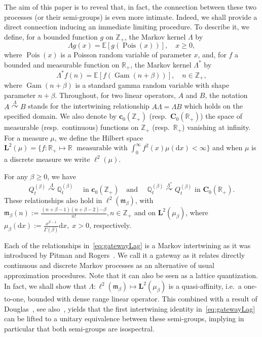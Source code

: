 \documentclass[AHL,Unicode,longabstracts]{cedram}
\DeclareMathOperator{\Pois}{Pois}
\DeclareMathOperator{\Gam}{Gam}
\newcommand{\df}{\mathrel{:=}}
\newcommand{\EE}{\mathbb{E}}
\newcommand{\RR}{\mathbb{R}}
\newcommand{\ZZ}{\mathbb{Z}}
\newcommand{\fm}{\mathfrak{m}}
\newcommand{\esL}{\mathbf{L}}
\newcommand{\esC}{\mathbf{C}}
\newcommand{\esc}{\mathbf{c}}
\newcommand*\E{{\mathbb E}}
\newcommand*\R{{\mathbb R}}
\newcommand{\discret}[1]{\mathds{#1}}
\newcommand{\cont}[1]{{#1}}
\newcommand{\adjL}{\Lambda^*}
\newcommand{\Gate}[3]{#1\stackrel{#2}{\curvearrowright}#3}
\newcommand*{\dd}{\mathrm{d}}
\newcommand*{\dx}{\dd x}
\begin{document}
The aim of this paper is to reveal that, in fact, the connection between these two processes (or their semi-groups) is even more intimate. Indeed, we shall provide a direct connection inducing an immediate limiting procedure. To describe it, we define, for a bounded function $g$ on $\ZZ_+$, the Markov kernel $\Lambda$ by
\begin{equation}\label{eq:Lambda-def}
\Lambda g (x) = \E\left[g(\Pois(x))\right], \quad x\geq 0,
\end{equation}
where $\Pois(x)$ is a Poisson random variable of parameter $x$, and, for $f$ a bounded and measurable function on $\RR_+$, the Markov kernel $\adjL$ by
\begin{equation}\label{eq:tild-Lambda-def}
\adjL f(n)=\EE[f(\Gam(n+\beta))],\quad n\in \ZZ_+,
\end{equation}
where $\Gam(n+\beta)$ is a standard gamma random variable with shape parameter $n+\beta$. Throughout, for two linear operators, $A$ and $B$, the notation $\Gate{A}{\Lambda}{B}$ stands for the intertwining relationship $A\Lambda=\Lambda B$ which holds on the specified domain. We also denote by $\esc_0(\ZZ_+)$ (resp.~$\esC_0(\RR_+)$) the space of measurable (resp.~continuous) functions on $\ZZ_+$ (resp.~$\RR_+$) vanishing at infinity. For a measure $\mu$, we define the Hilbert space $\esL^2(\mu)=\{f :\RR_+\mapsto \R \; \text{ measurable with } \int_{0}^{\infty}f^2(x) \mu(\dx)<\infty\}$ and when $\mu$ is a discrete measure we write $\ell^2(\mu)$.

\begin{theo}\label{thm:main}
\label{semig}
For any $\beta\geq 0$, we have
\begin{equation}
\Gate{\cont{Q}_t^{(\beta)}}{\Lambda}{\discret{Q}_t^{(\beta)}} \quad \text{ in $\esc_0(\ZZ_+)$ }
\text{ and } \quad
\Gate{\discret{Q}_t^{(\beta)}}{\adjL}{\cont{Q}_t^{(\beta)}} \text{ in $\esC_0(\RR_+)$}.\label{eq:gatewayLag}
\end{equation}
These relationships also hold in $ \ell^2({\fm_{\beta}})$, with $\fm_{\beta}(n)\df \frac{(n+\beta-1)(n+\beta-2)\cdots \beta}{n!}, n\in \ZZ_+$ and on $\esL^2(\mu_{\beta})$, where $\mu_{\beta}(\dx)\df \frac{x^{\beta-1}}{\Gamma(\beta)}\dx, \; x>0$, respectively.
\end{theo}


Each of the relationships in~\eqref{eq:gatewayLag} is a Markov intertwining as it was introduced by Pitman and Rogers~\cite{Pitman1981}. We call it a gateway as it relates directly continuous and discrete Markov processes as an alternative of usual approximation procedures. Note that it can also be seen as a lattice quantization. In fact, we shall show that $\Lambda : \ell^2({\fm_{\beta}}) \mapsto \esL^2(\mu_{\beta})$ is a quasi-affinity, i.e.~a one-to-one, bounded with dense range linear operator. This combined with a result of Douglas~\cite{Douglas}, see also~\cite[Proposition~3.H]{SpectralBook}, yields that the first intertwining identity in~\eqref{eq:gatewayLag} can be lifted to a unitary equivalence between these semi-groups, implying in particular that both semi-groups are isospectral.
\end{document}
